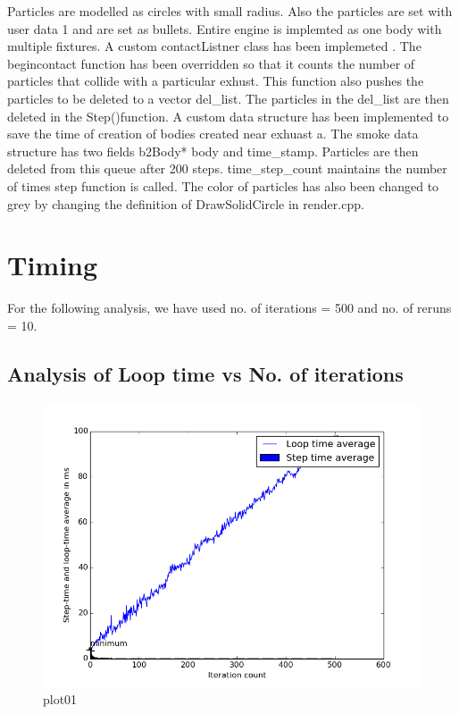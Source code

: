 \documentclass[pdftex,12pt,a4paper]{article}
\begin{document}
\par{Particles are modelled as circles with small radius. Also the particles are set with user data 1 and are set as bullets.	Entire engine is implemted as one body with multiple fixtures. A custom contactListner class\cite{contactlistener} has been implemeted . The  begincontact function has been overridden so that it counts the number of particles that collide with a particular exhust. This function also pushes the particles to be deleted to a vector del\_list. The particles in the del\_list are then deleted in the Step()function. A custom data structure has been implemented to save the time of creation of bodies created near exhuast a. The smoke data structure has two fields b2Body* body and time\_stamp. Particles are then deleted from this queue after 200 steps. time\_step\_count maintains the number of times step function is called. The color of particles has also been changed to grey by changing the definition of DrawSolidCircle in render.cpp.}

\section{Timing}
\par{For the following analysis, we have used no. of iterations = 500 and no. of reruns = 10.}
\subsection{Analysis of Loop time vs No. of iterations}

\begin{figure}[h!]
\centering
\includegraphics[scale=.60]{../images/plot01.png}
\caption{plot01}
\end{figure}
\end{document}
